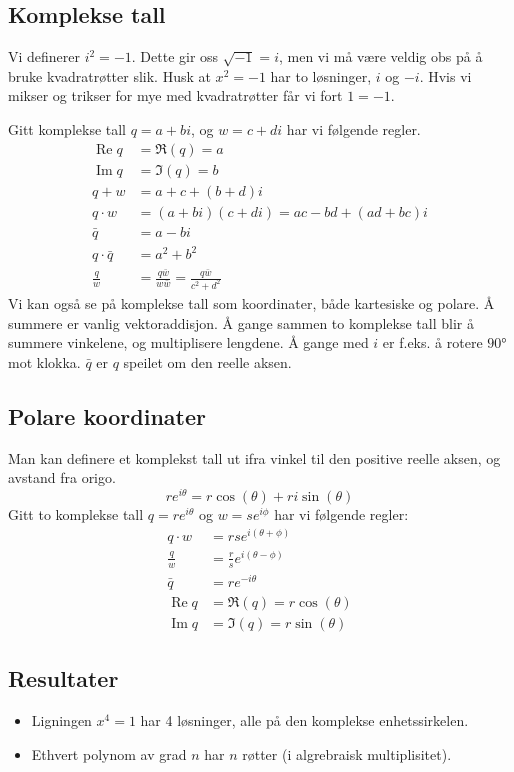 \documentclass[12pt,a4paper,norsk]{article}
\DeclareMathOperator{\Ima}{Im} %
\DeclareMathOperator{\Rea}{Re}
\begin{document}
\clearpage
\appendixpage{}
\addappheadtotoc{}
\begin{appendices}
\section{Komplekse tall}
Vi definerer $i^{2} = -1$. Dette gir oss $\sqrt{-1} = i$, men vi må være veldig
obs på å bruke kvadratrøtter slik. Husk at $x^{2} = -1$ har to løsninger, $i$ og
$-i$. Hvis vi mikser og trikser for mye med kvadratrøtter får vi fort $1 = -1$.

Gitt komplekse tall $q = a + bi$, og $w = c + di$ har vi følgende regler.
\begin{align*}
  \Rea q &= \Re(q) = a \\
  \Ima q &= \Im(q) = b \\
  q + w &= a+c + (b+d)i \\
  q \cdot w &= (a+bi)(c+di) = ac - bd + (ad+bc)i \\
  \bar{q} &= a - bi\\
  q \cdot \bar{q} &= a^{2} + b^{2} \\
  \frac{q}{w} &= \frac{q\bar{w}}{w\bar{w}} = \frac{q\bar{w}}{c^{2}+d^{2}}
\end{align*}
Vi kan også se på komplekse tall som koordinater, både kartesiske og polare. Å
summere er vanlig vektoraddisjon. Å gange sammen to komplekse tall blir å
summere vinkelene, og multiplisere lengdene. Å gange med $i$ er f.eks. å rotere
$\ang{90}$ mot klokka. $\bar{q}$ er $q$ speilet om den reelle aksen.

\subsection{Polare koordinater}
Man kan definere et komplekst tall ut ifra vinkel til den positive reelle aksen,
og avstand fra origo.
\[re^{i\theta} = r\cos(\theta) + ri\sin(\theta)\]
Gitt to komplekse tall $q = re^{i\theta}$ og $w = se^{i\phi}$ har vi følgende regler:
\begin{align*}
  q \cdot w &= rse^{i(\theta + \phi)} \\
  \frac{q}{w} &= \frac{r}{s}e^{i(\theta-\phi)} \\
  \bar{q} &= re^{-i\theta} \\
  \Rea q &= \Re(q) = r\cos(\theta) \\
  \Ima q &= \Im(q) = r\sin(\theta)
\end{align*}

\subsection{Resultater}
\begin{itemize}
  \item Ligningen $x^{4} = 1$ har 4 løsninger, alle på den komplekse
    enhetssirkelen.
  \item Ethvert polynom av grad $n$ har $n$ røtter (i algrebraisk multiplisitet).
\end{itemize}


\end{appendices}
\end{document}
